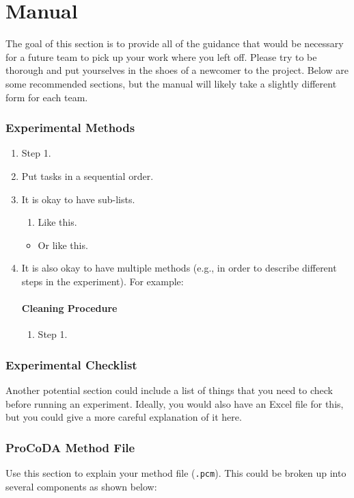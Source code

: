 \documentclass[a4paper]{article}
\begin{document}
\clearpage

\part*{Manual}
The goal of this section is to provide all of the guidance that would be necessary for a future team to pick up your work where you left off. Please try to be thorough and put yourselves in the shoes of a newcomer to the project. Below are some recommended sections, but the manual will likely take a slightly different form for each team.

\section*{Experimental Methods}
\begin{enumerate}
\item Step 1.
\item Put tasks in a sequential order.
\item It is okay to have sub-lists.
	\begin{enumerate}
    \item Like this.
    \end{enumerate}
    \begin{itemize}
	\item Or like this.
	\end{itemize}
\item It is also okay to have multiple methods (e.g., in order to describe different steps in the experiment). For example:

\subsection*{Cleaning Procedure}
\begin{enumerate}
\item Step 1.
\end{enumerate}
\end{enumerate}

\section*{Experimental Checklist}
Another potential section could include a list of things that you need to check before running an experiment. Ideally, you would also have an Excel file for this, but you could give a more careful explanation of it here.

\section*{ProCoDA Method File}
Use this section to explain your method file (\texttt{.pcm}). This could be broken up into several components as shown below:
\end{document}
